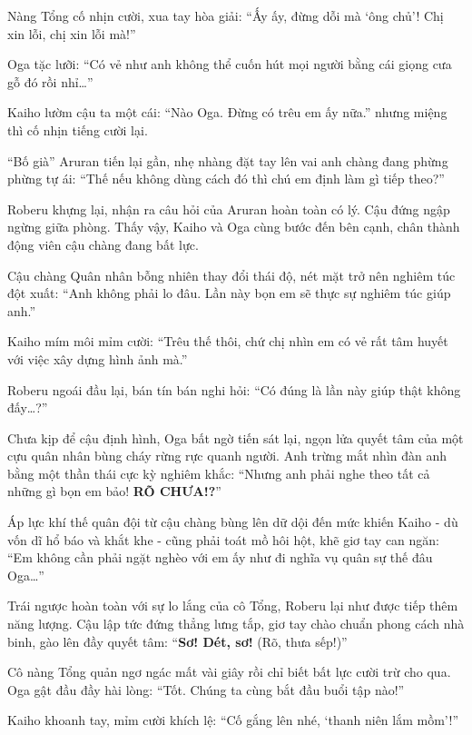 \documentclass[../main.tex]{subfiles}
\begin{document}
Nàng Tổng cố nhịn cười, xua tay hòa giải: ``Ấy ấy, đừng dỗi mà `ông chủ'! Chị xin lỗi, chị xin lỗi mà!''

Oga tặc lưỡi: ``Có vẻ như anh không thể cuốn hút mọi người bằng cái giọng cưa gỗ đó rồi nhỉ\dots''

Kaiho lườm cậu ta một cái: ``Nào Oga. Đừng có trêu em ấy nữa.'' nhưng miệng thì cố nhịn tiếng cười lại.

``Bố già'' Aruran tiến lại gần, nhẹ nhàng đặt tay lên vai anh chàng đang phừng phừng tự ái: ``Thế nếu không dùng cách đó thì chú em định làm gì tiếp theo?''

Roberu khựng lại, nhận ra câu hỏi của Aruran hoàn toàn có lý. Cậu đứng ngập ngừng giữa phòng. Thấy vậy, Kaiho và Oga cùng bước đến bên cạnh, chân thành động viên cậu chàng đang bất lực.

Cậu chàng Quân nhân bỗng nhiên thay đổi thái độ, nét mặt trở nên nghiêm túc đột xuất: ``Anh không phải lo đâu. Lần này bọn em sẽ thực sự nghiêm túc giúp anh.''

Kaiho mím môi mỉm cười: ``Trêu thế thôi, chứ chị nhìn em có vẻ rất tâm huyết với việc xây dựng hình ảnh mà.''

Roberu ngoái đầu lại, bán tín bán nghi hỏi: ``Có đúng là lần này giúp thật không đấy\dots?''

Chưa kịp để cậu định hình, Oga bất ngờ tiến sát lại, ngọn lửa quyết tâm của một cựu quân nhân bùng cháy rừng rực quanh người. Anh trừng mắt nhìn đàn anh bằng một thần thái cực kỳ nghiêm khắc: ``Nhưng anh phải nghe theo tất cả những gì bọn em bảo! \textbf{RÕ CHƯA!?}''

Áp lực khí thế quân đội từ cậu chàng bùng lên dữ dội đến mức khiến Kaiho - dù vốn dĩ hổ báo và khắt khe - cũng phải toát mồ hôi hột, khẽ giơ tay can ngăn: ``Em không cần phải ngặt nghèo với em ấy như đi nghĩa vụ quân sự thế đâu Oga\dots''

Trái ngược hoàn toàn với sự lo lắng của cô Tổng, Roberu lại như được tiếp thêm năng lượng. Cậu lập tức đứng thẳng lưng tắp, giơ tay chào chuẩn phong cách nhà binh, gào lên đầy quyết tâm: ``\textbf{Sơ! Dét, sơ!} (Rõ, thưa sếp!)''


Cô nàng Tổng quản ngơ ngác mất vài giây rồi chỉ biết bất lực cười trừ cho qua. Oga gật đầu đầy hài lòng: ``Tốt. Chúng ta cùng bắt đầu buổi tập nào!''

Kaiho khoanh tay, mỉm cười khích lệ: ``Cố gắng lên nhé, `thanh niên lắm mồm'!''

\ct
\end{document}
